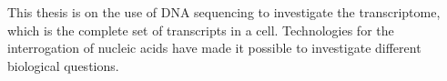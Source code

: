 This thesis is on the use of DNA sequencing to investigate the transcriptome, which is the complete set of transcripts in a cell. Technologies for the interrogation of nucleic acids have made it possible to investigate different biological questions.

